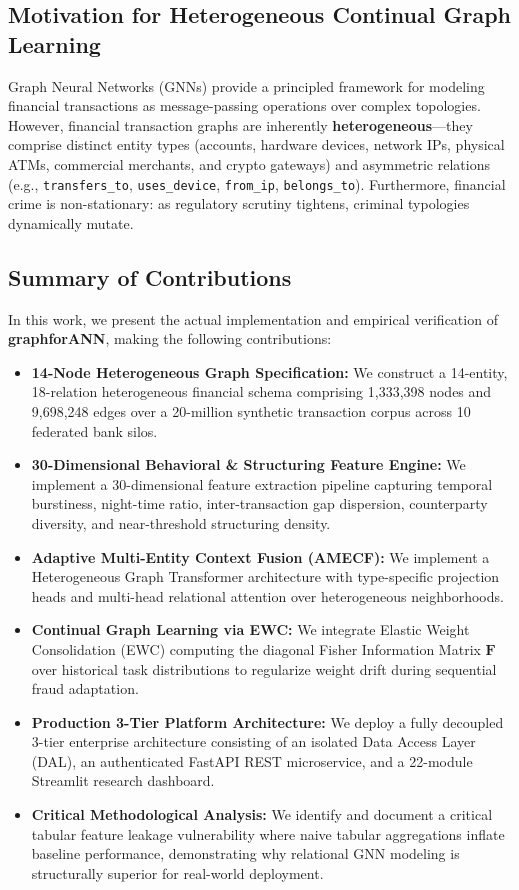 \documentclass[conference]{IEEEtran}
\begin{document}
\subsection{Motivation for Heterogeneous Continual Graph Learning}
Graph Neural Networks (GNNs) provide a principled framework for modeling financial transactions as message-passing operations over complex topologies. However, financial transaction graphs are inherently \textbf{heterogeneous}---they comprise distinct entity types (accounts, hardware devices, network IPs, physical ATMs, commercial merchants, and crypto gateways) and asymmetric relations (e.g., \texttt{transfers\_to}, \texttt{uses\_device}, \texttt{from\_ip}, \texttt{belongs\_to}). Furthermore, financial crime is non-stationary: as regulatory scrutiny tightens, criminal typologies dynamically mutate.

\subsection{Summary of Contributions}
In this work, we present the actual implementation and empirical verification of \textbf{graphforANN}, making the following contributions:
\begin{itemize}
    \item \textbf{14-Node Heterogeneous Graph Specification:} We construct a 14-entity, 18-relation heterogeneous financial schema comprising 1,333,398 nodes and 9,698,248 edges over a 20-million synthetic transaction corpus across 10 federated bank silos.
    \item \textbf{30-Dimensional Behavioral \& Structuring Feature Engine:} We implement a 30-dimensional feature extraction pipeline capturing temporal burstiness, night-time ratio, inter-transaction gap dispersion, counterparty diversity, and near-threshold structuring density.
    \item \textbf{Adaptive Multi-Entity Context Fusion (AMECF):} We implement a Heterogeneous Graph Transformer architecture with type-specific projection heads and multi-head relational attention over heterogeneous neighborhoods.
    \item \textbf{Continual Graph Learning via EWC:} We integrate Elastic Weight Consolidation (EWC) computing the diagonal Fisher Information Matrix $\mathbf{F}$ over historical task distributions to regularize weight drift during sequential fraud adaptation.
    \item \textbf{Production 3-Tier Platform Architecture:} We deploy a fully decoupled 3-tier enterprise architecture consisting of an isolated Data Access Layer (DAL), an authenticated FastAPI REST microservice, and a 22-module Streamlit research dashboard.
    \item \textbf{Critical Methodological Analysis:} We identify and document a critical tabular feature leakage vulnerability where naive tabular aggregations inflate baseline performance, demonstrating why relational GNN modeling is structurally superior for real-world deployment.
\end{itemize}
\end{document}
